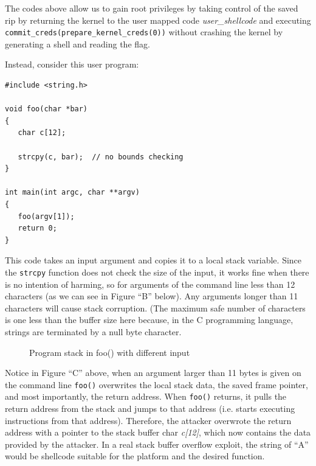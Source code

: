 \documentclass{masterthesis}
\begin{document}
The codes above allow us to gain root privileges by taking control of the saved rip by returning the kernel to the user mapped code \textit{user_shellcode} and executing \texttt{commit_creds(prepare_kernel_creds(0))} without crashing the kernel by generating a shell and reading the flag.

Instead, consider this user program:
\begin{lstlisting}
#include <string.h>

void foo(char *bar)
{
   char c[12];

   strcpy(c, bar);  // no bounds checking
}

int main(int argc, char **argv)
{
   foo(argv[1]);
   return 0;
}
\end{lstlisting}
This code takes an input argument and copies it to a local stack variable. Since the \texttt{strcpy} function does not check the size of the input, it works fine when there is no intention of harming, so for arguments of the command line less than 12 characters (as we can see in Figure ``B'' below). Any arguments longer than 11 characters will cause stack corruption. (The maximum safe number of characters is one less than the buffer size here because, in the C programming language, strings are terminated by a null byte character. 

\begin{figure}[h!]
   \caption{Program stack in foo() with different input}
   \label{stackoverflow}
\end{figure} 

Notice in Figure ``C'' above, when an argument larger than 11 bytes is given on the command line \texttt{foo()} overwrites the local stack data, the saved frame pointer, and most importantly, the return address. When \texttt{foo()} returns, it pulls the return address from the stack and jumps to that address (i.e. starts executing instructions from that address). Therefore, the attacker overwrote the return address with a pointer to the stack buffer char \textit{c[12]}, which now contains the data provided by the attacker. In a real stack buffer overflow exploit, the string of ``A'' would be shellcode suitable for the platform and the desired function.
\end{document}
